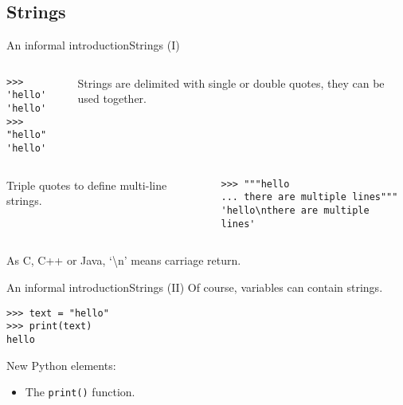 \documentclass[10pt,compress]{beamer} %
\begin{document}
\subsection{Strings}
\begin{frame}[fragile]{An informal introduction}{Strings (I)}
   	\begin{columns}
		\begin{block}{}
		\begin{verbatim}
>>> 'hello'
'hello'
>>> "hello"
'hello'
\end{verbatim}
		\end{block}

		Strings are delimited with single or double quotes, they can be used together.
	\end{columns}

   	\begin{columns}
			Triple quotes to define multi-line strings.

		\begin{block}{}
			\begin{verbatim}
>>> """hello
... there are multiple lines"""
'hello\nthere are multiple lines'
\end{verbatim}
			\end{block}
	\end{columns}
	\bigskip
	As C, C++ or Java, `\textbackslash n' means carriage return.
\end{frame}

\begin{frame}[fragile]{An informal introduction}{Strings (II)}
	Of course, variables can contain strings.
	\begin{block}{}
		\begin{verbatim}
>>> text = "hello"
>>> print(text)
hello
\end{verbatim}
	\end{block}

    New Python elements:
    \begin{itemize}
        \item The \texttt{print()} function.
    \end{itemize}
\end{frame}
\end{document}
